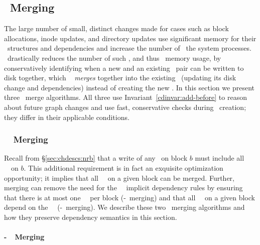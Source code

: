 \subsection{\ChDesc\ Merging}
\label{sec:patch:merge}

The large number of small, distinct changes made for cases such as
block allocations, inode updates, and directory updates use
significant memory for their \chdesc\ structures and dependencies and
increase the number of \chdescs\ the system processes.
%
\Kudos\ drastically reduces the number of such \chdescs, and thus
\chdesc\ memory usage, by conservatively identifying when a new and an
existing \chdesc\ pair can be written to disk together, which \Kudos\
%
\emph{merges} together into the existing \chdesc\ (updating its disk
change and dependencies) instead of creating the new \chdesc.
%
In this section we present three \chdesc\ merge algorithms. All three
use Invariant~\ref{cdinvar:add-before} to reason about future graph
changes and use fast, conservative checks during \chdesc\ creation; they
differ in their applicable conditions.

\subsubsection{\Nrb\ \ChDesc\ Merging}
\label{sec:chdescs:merge:nrb}

Recall from \S\ref{sec:chdescs:nrb} that a write of any \chdescs\ on block
$b$ must include all \nrb\ \chdescs\ on $b$.
%
This additional requirement is in fact an exquisite optimization
opportunity; it implies that all \nrb\ \chdescs\ on a given block can
be merged.
%
Further, merging can remove the need for the \nrb\ \chdesc\ implicit
dependency rules by ensuring that
%
there is at most one \nrb\ \chdesc\ per block (\nrb-\nrb\ merging)
%
and that all \rb\ \chdescs\ on a given block depend on the \nrb\ \chdesc\
(\nrb-\rb\ merging).
%
We describe these two \chdesc\ merging algorithms and how they
preserve dependency semantics in this section.

\paragraph{\Nrb-\Nrb\ \ChDesc\ Merging}
\label{sec:chdescs:merge:nrb:hard-hard}


